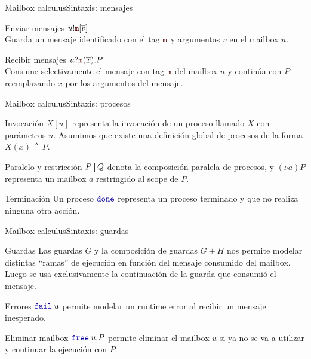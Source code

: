 \documentclass{beamer}
\newcommand{\msgtag}[1]{\texttt{\textcolor{msg-color}{#1}}}
\newcommand{\msgstore}[2]{\msgtag{#1}[\overline{#2}]}
\newcommand{\msgreceive}[2]{\msgtag{#1}(\overline{#2})}
\newcommand{\done}{\texttt{\textcolor{keyword}{done}}}
\newcommand{\free}[1]{\texttt{\textcolor{keyword}{free}}\hspace{0.25em}#1}
\newcommand{\fail}[1]{\texttt{\textcolor{keyword}{fail}}\hspace{0.25em}#1}
\newcommand{\parbar}{\kern3pt\rule[-3pt]{0.8pt}{0.9\baselineskip}\kern3pt}
\begin{document}
\begin{frame}{Mailbox calculus}{Sintaxis: mensajes}
    \begin{block}{Enviar mensajes}
        $u!\msgstore{m}{v}$
        \\ Guarda un mensaje identificado con el tag $\msgtag{m}$ y argumentos $\overline{v}$ en el mailbox $u$.
    \end{block}

    \begin{block}{Recibir mensajes}
        $u?\msgreceive{m}{x}.P$ \\ Consume selectivamente el mensaje con tag $\msgtag{m}$ del mailbox $u$ y continúa con $P$ reemplazando $\overline{x}$ por los argumentos del mensaje.
    \end{block}
\end{frame}

\begin{frame}{Mailbox calculus}{Sintaxis: procesos}
    \begin{block}{Invocación}
        $X[\overline{u}]$ representa la invocación de un proceso llamado $X$ con parámetros $\overline{u}$. Asumimos que existe una definición global de procesos de la forma $X(\overline{x}) \triangleq P$.
    \end{block}

    \begin{block}{Paralelo y restricción}
        $P \parbar Q$ denota la composición paralela de procesos, y $(\nu a) P$ representa un mailbox $a$ restringido al scope de $P$.
    \end{block}

    \begin{block}{Terminación}
        Un proceso $\done$ representa un proceso terminado y que no realiza ninguna otra acción.
    \end{block}
\end{frame}

\begin{frame}{Mailbox calculus}{Sintaxis: guardas}
    \begin{block}{Guardas}
        Las guardas $G$ y la composición de guardas $G+H$ nos permite modelar distintas ``ramas'' de ejecución en función del mensaje consumido del mailbox. Luego se usa exclusivamente la continuación de la guarda que consumió el mensaje.
    \end{block}

    \begin{block}{Errores}
        $\fail{u}$ permite modelar un runtime error al recibir un mensaje inesperado.
    \end{block}

    \begin{block}{Eliminar mailbox}
        $\free{u}.P$ permite eliminar el mailbox $u$ si ya no se va a utilizar y continuar la ejecución con $P$.
    \end{block}
\end{frame}
\end{document}
